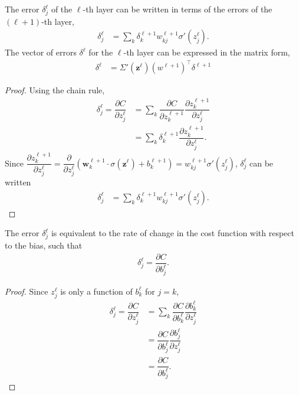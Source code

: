 \begin{lemma}
	The error $\delta^\ell_j$ of the $\ell$-th layer can be written in terms of the errors of the $(\ell + 1)$-th layer, 
	\begin{align}
		\delta_j^\ell & = \sum_k\delta_k^{\ell+1}w_{kj}^{\ell+1}\sigma'(z_j^\ell).
	\end{align}
	The vector of errors $\delta^\ell$ for the $\ell$-th layer can be expressed in the matrix form,
	\begin{align}\label{nnets-bprop-eq2}
		\delta^\ell & = \Sigma'(\mathbf{z}^\ell)(w^{\ell+1})^\intercal\delta^{\ell+1}
	\end{align}
\end{lemma}

\begin{proof}
	Using the chain rule,
	\begin{align}
		\delta_j^\ell = \dfrac{\partial C}{\partial z_j^\ell}& = \sum_k\dfrac{\partial C}{\partial z_k^{\ell+1}}\dfrac{\partial z_k^{\ell+1}}{\partial z_j^\ell} \\
		& = \sum_k\delta_k^{\ell+1}\dfrac{\partial z_k^{\ell+1}}{\partial z_j^\ell}.
	\end{align}
	Since $\dfrac{\partial z_k^{\ell+1}}{\partial z_j^\ell} = \dfrac{\partial}{\partial z_j^\ell}(\mathbf{w}_k^{\ell+1}\cdot\sigma(\mathbf{z}^\ell) + b_k^{\ell+1}) = w_{kj}^{\ell+1}\sigma'(z_j^\ell)$, $\delta_j^\ell$ can be written
	\begin{align}
		\delta_j^\ell & = \sum_k\delta_k^{\ell+1}w_{kj}^{\ell+1}\sigma'(z_j^\ell).
	\end{align}
\end{proof}

\begin{lemma}
	The error $\delta_j^\ell$ is equivalent to the rate of change in the cost function with respect to the bias, such that
	\begin{align}\label{nnets-bprop-eq3}
		\delta_j^\ell = \dfrac{\partial C}{\partial b_j^\ell}.
	\end{align}
\end{lemma}
\begin{proof}
	Since $z_j^\ell$ is only a function of $b_k^\ell$ for $j = k$,
	\begin{align}
		\delta_j^\ell = \dfrac{\partial C}{\partial z_j^\ell} & = \sum_k\dfrac{\partial C}{\partial b_k^\ell}\dfrac{\partial b_k^\ell}{\partial z_j^\ell}\\
		& = \dfrac{\partial C}{\partial b_j^\ell}\dfrac{\partial b_j^\ell}{\partial z_j^\ell} \\
		& = \dfrac{\partial C}{\partial b_j^\ell}.
	\end{align}
\end{proof}


